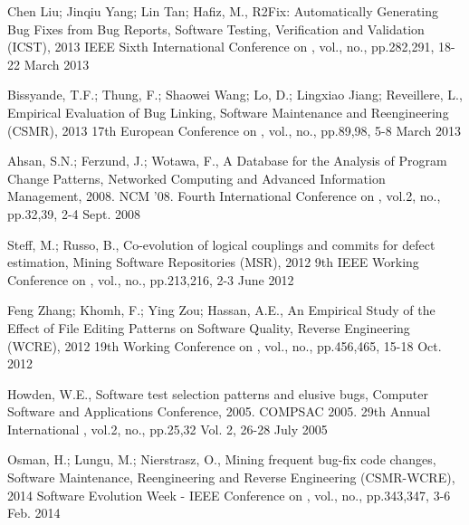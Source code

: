 \documentclass[conference]{IEEEtran}
\begin{document}
\begin{thebibliography}{1}
   Chen Liu; Jinqiu Yang; Lin Tan; Hafiz, M., R2Fix: Automatically Generating Bug Fixes from Bug Reports, Software Testing, Verification and Validation (ICST), 2013 IEEE Sixth International Conference on , vol., no., pp.282,291, 18-22 March 2013

  Bissyande, T.F.; Thung, F.; Shaowei Wang; Lo, D.; Lingxiao Jiang; Reveillere, L., Empirical Evaluation of Bug Linking, Software Maintenance and Reengineering (CSMR), 2013 17th European Conference on , vol., no., pp.89,98, 5-8 March 2013


   Ahsan, S.N.; Ferzund, J.; Wotawa, F., A Database for the Analysis of Program Change Patterns, Networked Computing and Advanced Information Management, 2008. NCM '08. Fourth International Conference on , vol.2, no., pp.32,39, 2-4 Sept. 2008

  Steff, M.; Russo, B., Co-evolution of logical couplings and commits for defect estimation, Mining Software Repositories (MSR), 2012 9th IEEE Working Conference on , vol., no., pp.213,216, 2-3 June 2012

   Feng Zhang; Khomh, F.; Ying Zou; Hassan, A.E., An Empirical Study of the Effect of File Editing Patterns on Software Quality, Reverse Engineering (WCRE), 2012 19th Working Conference on , vol., no., pp.456,465, 15-18 Oct. 2012


   Howden, W.E., Software test selection patterns and elusive bugs, Computer Software and Applications Conference, 2005. COMPSAC 2005. 29th Annual International , vol.2, no., pp.25,32 Vol. 2, 26-28 July 2005

   Osman, H.; Lungu, M.; Nierstrasz, O., Mining frequent bug-fix code changes, Software Maintenance, Reengineering and Reverse Engineering (CSMR-WCRE), 2014 Software Evolution Week - IEEE Conference on , vol., no., pp.343,347, 3-6 Feb. 2014

\end{thebibliography}


\end{document}
